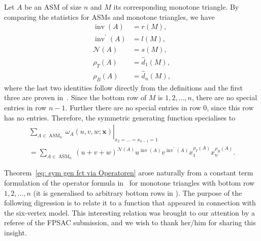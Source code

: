 \documentclass[11pt]{article}
\theoremstyle{definition}
\numberwithin{equation}{section}
\newcommand{\x}{\mathbf{x}}
\DeclareMathOperator{\ASM}{ASM}
\DeclareMathOperator{\inv}{inv}
\newcounter{x}
\newcounter{y}
\newcounter{z}
\begin{document}
Let $A$ be an ASM of size $n$ and $M$ its corresponding monotone triangle. By comparing the statistics for ASMs and monotone triangles, we have
\begin{align*}
\inv(A) &= r(M), \\
\inv^\prime(A) &= l(M),\\
\mathcal{N}(A) &= s(M),\\
\rho_T(A) &= \widehat{d}_1(M),\\
\rho_B(A) &= \widehat{d}_n(M),
\end{align*}
where the last two identities follow directly from the definitions and the first three are proven in~\cite{FischerSchreierAigner23}.
Since the bottom row of $M$ is $1,2,\ldots,n$, there are no special entries in row $n-1$. Further there are no special entries in row $0$, since this row has no entries. Therefore, the symmetric generating function specialises to
\begin{multline}
\label{eq: specialisation of sym gen fct}
\left. \sum_{A \in \ASM_n} \omega_A(u,v,w;\x) \right|_{x_2 = \ldots =x_{n-1}=1} \\=
\sum_{A \in \ASM_n}  (u+ v+w)^{\mathcal{N}(A)}  u^{\inv(A)}  v^{\inv^\prime(A)} x_1^{\rho_T(A)} x_n^{\rho_B(A)}.
\end{multline}

Theorem~\ref{eq: sym gen fct via Operatoren} arose naturally from a constant term formulation of the operator formula in~\cite{Fischer06} for monotone triangles with bottom row $1,2,\ldots,n$ (it is generalised to arbitrary bottom rows in \cite[Theorem 3.1]{FischerSchreierAigner23}). The purpose of the following digression is to relate it to a function that appeared in connection with the six-vertex model. This interesting relation was brought to our attention by a referee of the FPSAC submission, and we wish to thank her/him for sharing this insight.
\end{document}
